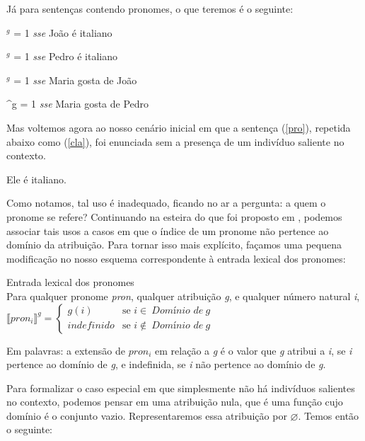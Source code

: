 Já para sentenças contendo pronomes, o que teremos é o seguinte:

\begin{exe}

\ex {}$^{g}$ = 1 \textit{sse} João é italiano

\ex {}$^{g}$ = 1 \textit{sse} Pedro é italiano

\ex {}$^{g}$ = 1 \textit{sse} Maria gosta de
João

\ex {}^{g} = 1 \textit{sse} Maria gosta de
Pedro

\end{exe}

Mas voltemos agora ao nosso cenário inicial em que a sentença
(\ref{pro}), repetida abaixo como (\ref{cla}), foi enunciada sem a
presença de um indivíduo saliente no contexto.

\begin{exe}
\ex Ele é italiano.\label{cla}
\end{exe}

Como notamos, tal uso é inadequado, ficando no ar a pergunta: a
quem o pronome se refere? Continuando na esteira do que foi proposto em \cite{heikra98}, podemos associar
tais usos a casos em que o índice de um pronome não pertence ao
domínio da atribuição. Para tornar isso mais explícito, façamos
uma pequena modificação no nosso esquema
correspondente à entrada lexical dos pronomes:

\begin{exe}
	\ex Entrada lexical dos pronomes\\
	Para qualquer pronome \textit{pron}, qualquer atribuição
	\textit{g}, e qualquer número natural \textit{i},\\
	
	$\llbracket pron_{i}\rrbracket^{g} =
	\begin{cases}
	g(i) & \text{se } i\in\ \textit{Domínio de}\ g\\
	indefinido & \text{se } i\not\in\ \textit{Domínio de}\ g
	\end{cases}$
\end{exe}



\n Em palavras: a extensão de $pron_{i}$ em relação a \textit{g} é
o valor que \textit{g} atribui a \textit{i}, se \textit{i}
pertence ao domínio de \textit{g}, e indefinida, se \textit{i} não
pertence ao domínio de \textit{g}.

Para formalizar o caso especial em que simplesmente não há
indivíduos salientes no contexto, podemos pensar em uma
atribuição nula, que é uma função cujo domínio é o conjunto
vazio. Representaremos
essa atribuição por $\varnothing$. Temos então o seguinte:

